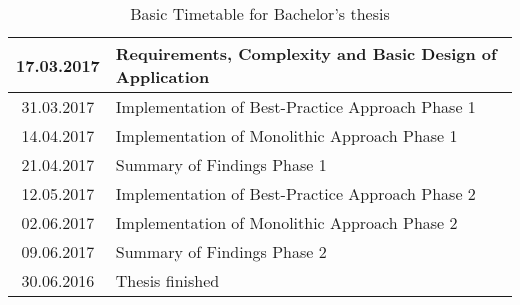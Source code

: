 \begin{table}
\begin{tabular}{|c|l|} \hline
17.03.2017 & Requirements, Complexity and Basic Design of Application \\ \hline
31.03.2017 & Implementation of Best-Practice Approach Phase 1 \\ \hline
14.04.2017 & Implementation of Monolithic Approach Phase 1 \\ \hline
21.04.2017 & Summary of Findings Phase 1 \\ \hline
12.05.2017 & Implementation of Best-Practice Approach Phase 2 \\ \hline
02.06.2017 & Implementation of Monolithic Approach Phase 2 \\ \hline
09.06.2017 & Summary of Findings Phase 2 \\ \hline
30.06.2016 & Thesis finished \\ \hline
\end{tabular}

\caption{Basic Timetable for Bachelor's thesis}
\end{table}


